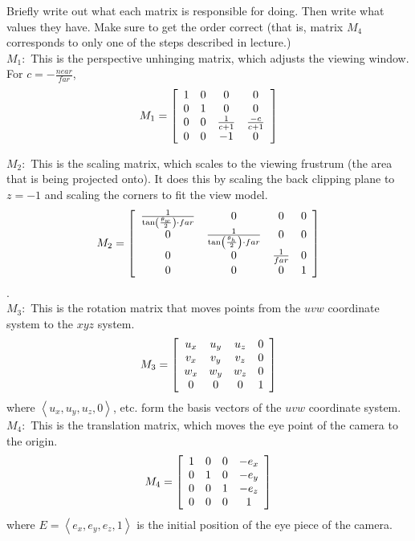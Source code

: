 \documentclass[10pt,twocolumn]{article}
\begin{document}
\begin{framed}
\noindent {\bf [1/2 pt. each]} Briefly write out what each matrix is responsible for doing. Then write what values they have. Make sure to get the order correct (that is, matrix $M_4$ corresponds to only one of the steps described in lecture.)\\

$M_1:$ This is the perspective unhinging matrix, which adjusts the viewing window. For $c = -\frac{near}{far}$, 
\[ M_1 = \left[
\begin{array}{c c c c }
1 & 0 & 0 & 0 \\
0 & 1 & 0 & 0 \\
0 & 0 & \frac{1}{c+1} & \frac{-c}{c+1} \\
0 & 0 & -1 & 0
\end{array} \right] \]

$M_2:$ This is the scaling matrix, which scales to the viewing frustrum (the area that is being
projected onto). It does this by scaling the back clipping plane to $z=-1$ and scaling the corners to fit the view model.
\[ M_2 = \left[
\begin{array} {c c c c}
\frac{1}{\tan \left( \frac{\theta_w}{2}\right) \cdot far} & 0 & 0 & 0 \\
0 & \frac{1}{\tan \left( \frac{\theta_h}{2}\right) \cdot far} & 0 & 0 \\
0 & 0 & \frac{1}{far} & 0 \\
0 & 0 & 0 & 1
\end{array} \right]
\]. \\

$M_3:$ This is the rotation matrix that moves points from the $uvw$ coordinate 
system to the $xyz$ system.
\[ M_3 = \left[
\begin{array} {c c c c}
u_x & u_y & u_z & 0 \\
v_x & v_y & v_z & 0 \\
w_x & w_y & w_z & 0 \\
0 & 0 & 0 & 1
\end{array} \right]
\] 
where $\left< u_x, u_y, u_z, 0\right>$, etc. form the basis vectors of the $uvw$
coordinate system.\\

$M_4:$ This is the translation matrix, which moves the eye point of the camera to
the origin.
\[ M_4 = \left[
\begin{array} {c c c c}
1 & 0 & 0 & -e_x \\
0 & 1 & 0 & -e_y \\
0 & 0 & 1 & -e_z \\ 
0 & 0 & 0 & 1
\end{array} \right]
\] 
where $E=\left<e_x, e_y, e_z, 1 \right>$ is the initial position of the eye
piece of the camera.


\end{framed}
\end{document}
